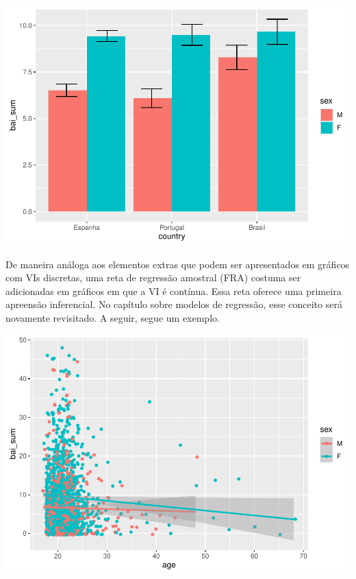 \documentclass[
]{book}
\newenvironment{Shaded}{\begin{snugshade}}{\end{snugshade}}
\newcommand{\DataTypeTok}[1]{\textcolor[rgb]{0.13,0.29,0.53}{#1}}
\newcommand{\KeywordTok}[1]{\textcolor[rgb]{0.13,0.29,0.53}{\textbf{#1}}}
\newcommand{\NormalTok}[1]{#1}
\newcommand{\OperatorTok}[1]{\textcolor[rgb]{0.81,0.36,0.00}{\textbf{#1}}}
\newcommand{\StringTok}[1]{\textcolor[rgb]{0.31,0.60,0.02}{#1}}
\begin{document}
\begin{center}\includegraphics{gitbook-demo_files/figure-latex/unnamed-chunk-25-1} \end{center}

De maneira análoga aos elementos extras que podem ser apresentados em gráficos com VIs discretas, uma reta de regressão amostral (FRA) costuma ser adicionadas em gráficos em que a VI é contínua. Essa reta oferece uma primeira apreensão inferencial. No capítulo sobre modelos de regressão, esse conceito será novamente revisitado. A seguir, segue um exemplo.

\begin{Shaded}
\end{Shaded}

\begin{center}\includegraphics{gitbook-demo_files/figure-latex/unnamed-chunk-26-1} \end{center}
\end{document}
